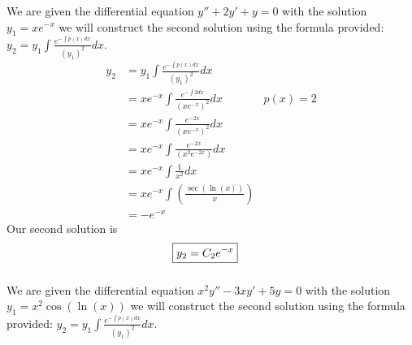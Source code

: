 \documentclass{article}
\begin{document}
\pagestyle{fancy}

\setcounter{section}{4}
\setcounter{subsection}{2}
\setcounter{subsubsection}{0}
\subsubsection{} 
 We are given the differential equation $ y'' + 2y' + y = 0$ with the solution $y_1 = xe^{-x}$ we will construct the second solution using the formula provided: $y_2 = y_1\int \frac{e^{- \int p(x)dx}}{(y_1)^2}dx$.
\begin{align}
    y_2 &= y_1\int \frac{e^{- \int p(x)dx}}{(y_1)^2}dx \\ 
    &  = xe^{-x}\int \frac{e^{- \int 2dx}}{(xe^{-x})^2}dx & p(x) = 2  \\
    & = xe^{-x}\int \frac{e^{-2x}}{(xe^{-x})^2}dx \\
    & = xe^{-x}\int \frac{e^{-2x}}{(x^2e^{-2x})}dx \\
    & = xe^{-x}\int \frac{1}{x^2}dx \\
    & = xe^{-x} \int (\frac{\sec(\ln(x))}{x}) \\
    & = -e^{-x}
\end{align}
Our second solution is 
\begin{align*}
    \Aboxed{y_2 = C_2 e^{-x}}
\end{align*}
\subsubsection{} 
We are given the differential equation $x^2y'' - 3xy' + 5y = 0$ with the solution $y_1 = x^2 \cos(\ln(x))$ we will construct the second solution using the formula provided: $y_2 = y_1\int \frac{e^{- \int p(x)dx}}{(y_1)^2}dx$.
\end{document}
